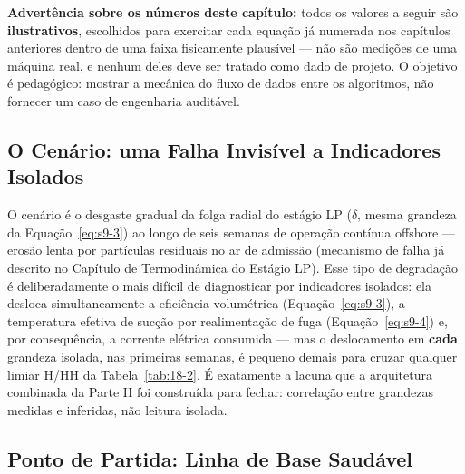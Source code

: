 \documentclass[12pt,a4paper]{article}
\numberwithin{equation}{section}
\numberwithin{table}{section}
\numberwithin{figure}{section}
\begin{document}
\textbf{Advertência sobre os números deste capítulo:} todos os valores a seguir são \textbf{ilustrativos}, escolhidos para exercitar cada equação já numerada nos capítulos anteriores dentro de uma faixa fisicamente plausível — não são medições de uma máquina real, e nenhum deles deve ser tratado como dado de projeto. O objetivo é pedagógico: mostrar a mecânica do fluxo de dados entre os algoritmos, não fornecer um caso de engenharia auditável.

\subsection{O Cenário: uma Falha Invisível a Indicadores Isolados}

O cenário é o desgaste gradual da folga radial do estágio LP ($\delta$, mesma grandeza da Equação~\eqref{eq:s9-3}) ao longo de seis semanas de operação contínua offshore — erosão lenta por partículas residuais no ar de admissão (mecanismo de falha já descrito no Capítulo de Termodinâmica do Estágio LP). Esse tipo de degradação é deliberadamente o mais difícil de diagnosticar por indicadores isolados: ela desloca simultaneamente a eficiência volumétrica (Equação~\eqref{eq:s9-3}), a temperatura efetiva de sucção por realimentação de fuga (Equação~\eqref{eq:s9-4}) e, por consequência, a corrente elétrica consumida — mas o deslocamento em \textbf{cada} grandeza isolada, nas primeiras semanas, é pequeno demais para cruzar qualquer limiar H/HH da Tabela~\ref{tab:18-2}. É exatamente a lacuna que a arquitetura combinada da Parte II foi construída para fechar: correlação entre grandezas medidas e inferidas, não leitura isolada.

\subsection{Ponto de Partida: Linha de Base Saudável}
\end{document}
